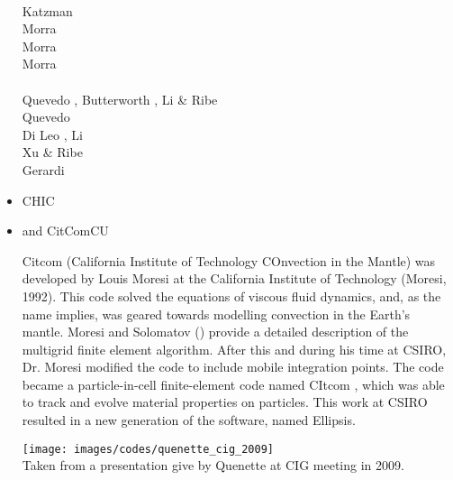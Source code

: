 \begin{itemize}
\begin{scriptsize}
\cite{crsr83}\\
Katzman \etal \cite{katl95}\\
Morra \etal \cite{moct07}\\
Morra \etal \cite{moct09}\\
Morra \etal \cite{moyb10}\\
\textcite{ribe10}\\
Quevedo \etal \cite{qumm12}, Butterworth \etal \cite{buqm12}, Li \& Ribe \cite{liri12}\\
Quevedo \etal \cite{quhm13}\\
Di Leo \etal \cite{diwl14}, Li \etal \cite{lidr14}\\
Xu \& Ribe \cite{xuri16}\\
Gerardi \etal \cite{gert19}
\end{scriptsize}

\item {\codefont CHIC}  

\begin{scriptsize}
\textcite{norv15}
\end{scriptsize}

\item \citcoms and {\codefont CitComCU} 

Citcom (California Institute of Technology COnvection in the Mantle) was  
developed by Louis Moresi at the California Institute of Technology (Moresi, 1992). 
This code solved the equations of viscous fluid dynamics, and, as the name implies, 
was geared towards modelling convection in the Earth's mantle. Moresi and 
Solomatov (\nineteenninetyfive) provide a detailed description of the multigrid
finite element algorithm. After this and during his time at CSIRO, Dr. Moresi 
modified the code to include mobile integration points. The code became a 
particle-in-cell finite-element code named CItcom , which was able to track 
and evolve material properties on particles. This work at
CSIRO resulted in a new generation of the software, named Ellipsis.

\begin{center}
\texttt{[image: images/codes/quenette\_cig\_2009]}\\
{\captionfont Taken from a presentation give by Quenette at CIG meeting in 2009.}
\end{center}


\end{itemize}
